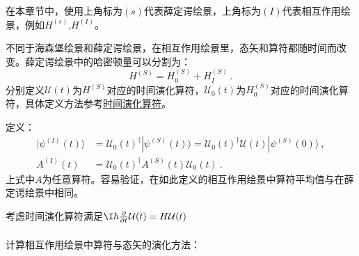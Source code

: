 
在本章节中，使用上角标为$(s)$代表薛定谔绘景，上角标为$(I)$代表相互作用绘景，例如$H^{(s)}$,$H^{(I)}$。

\begin{definition}{}

不同于海森堡绘景和薛定谔绘景，在相互作用绘景里，态矢和算符都随时间而改变。薛定谔绘景中的哈密顿量可以分割为：
\begin{equation}
H^{(S)}=H^{(S)}_0+H^{(S)}_I~.
\end{equation}
分别定义$\mathcal U(t)$为$H^{(S)}$对应的时间演化算符，$\mathcal U_0(t)$为$H^{(S)}_0$对应的时间演化算符，具体定义方法参考\href{https://wuli.wiki/online/TOprt.html}{时间演化算符}。

定义：
\begin{align}
|\psi^{(I)}(t)\rangle&=\mathcal U_0(t)^\dagger|\psi^{(S)}(t)\rangle=\mathcal U_0(t)^\dagger\mathcal U(t)|\psi^{(S)}(0)\rangle~, \\
A^{(I)}(t)&=\mathcal U_0(t)^\dagger A^{(S)}(t)\mathcal U_0 (t)~.
\end{align}
上式中$A$为任意算符。容易验证，在如此定义的相互作用绘景中算符平均值与在薛定谔绘景中相同。

\end{definition}

考虑时间演化算符满足$\I\hbar\frac{\partial}{\partial t}\mathcal{U}(t) = H\mathcal{U}(t)$
\begin{align}
\end{align}

计算相互作用绘景中算符与态矢的演化方法：
\begin{align}
\end{align}



